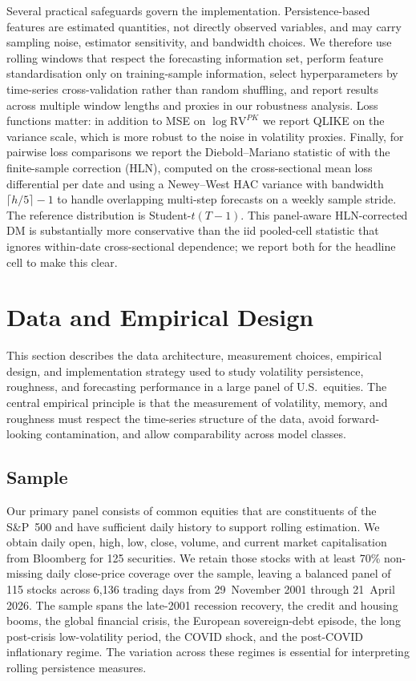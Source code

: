 \documentclass[11pt,a4paper]{article}
\newcommand{\RVPK}{\mathrm{RV}^{PK}}
\begin{document}
Several practical safeguards govern the implementation. Persistence-based
features are estimated quantities, not directly observed variables, and
may carry sampling noise, estimator sensitivity, and bandwidth choices.
We therefore use rolling windows that respect the forecasting information
set, perform feature standardisation only on training-sample information,
select hyperparameters by time-series cross-validation rather than random
shuffling, and report results across multiple window lengths and proxies
in our robustness analysis. Loss functions matter: in addition to MSE on
$\log\RVPK$ we report QLIKE on the variance scale, which is more robust
to the noise in volatility proxies. Finally, for pairwise loss comparisons
we report the Diebold--Mariano statistic of
\citet{diebold1995comparing} with the
\citet{harvey1997testing} finite-sample correction (HLN), computed on
the cross-sectional mean loss differential per date and using a
Newey--West HAC variance with bandwidth $\lceil h/5\rceil-1$ to handle
overlapping multi-step forecasts on a weekly sample stride. The
reference distribution is Student-$t(T-1)$. This panel-aware
HLN-corrected DM is substantially more conservative than the iid
pooled-cell statistic that ignores within-date cross-sectional
dependence; we report both for the headline cell to make this clear.

\section{Data and Empirical Design}
\label{sec:data}

This section describes the data architecture, measurement choices,
empirical design, and implementation strategy used to study volatility
persistence, roughness, and forecasting performance in a large panel of
U.S.\ equities. The central empirical principle is that the measurement
of volatility, memory, and roughness must respect the time-series
structure of the data, avoid forward-looking contamination, and allow
comparability across model classes.

\subsection{Sample}

Our primary panel consists of common equities that are constituents of
the S\&P~500 and have sufficient daily history to support rolling
estimation. We obtain daily open, high, low, close, volume, and current
market capitalisation from Bloomberg for 125 securities. We retain those
stocks with at least 70\% non-missing daily close-price coverage over the
sample, leaving a balanced panel of 115 stocks across 6,136 trading days
from 29~November 2001 through 21~April 2026. The sample spans the
late-2001 recession recovery, the credit and housing booms, the global
financial crisis, the European sovereign-debt episode, the long
post-crisis low-volatility period, the COVID shock, and the post-COVID
inflationary regime. The variation across these regimes is essential for
interpreting rolling persistence measures.
\end{document}
